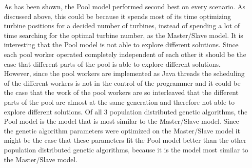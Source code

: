 \noindent As has been shown, the Pool model performed second best on every scenario. As discussed above, this could be because it spends most of its time optimizing turbine positions for a decided number of turbines, instead of spending a lot of time searching for the optimal turbine number, as the Master/Slave model. It is interesting that the Pool model is not able to explore different solutions. Since each pool worker operated completely independent of each other it should be the case that different parts of the pool is able to explore different solutions. However, since the pool workers are implemented as Java threads the scheduling of the different workers is not in the control of the programmer and it could be the case that the work of the pool workers are so interleaved that the different parts of the pool are almost at the same generation and therefore not able to explore different solutions. Of all 3 population distributed genetic algorithms, the Pool model is the model that is most similar to the Master/Slave model. Since the genetic algorithm parameters were optimized on the Master/Slave model it might be the case that these parameters fit the Pool model better than the other population distributed genetic algorithms, because it is the model most similar to the Master/Slave model.\\

